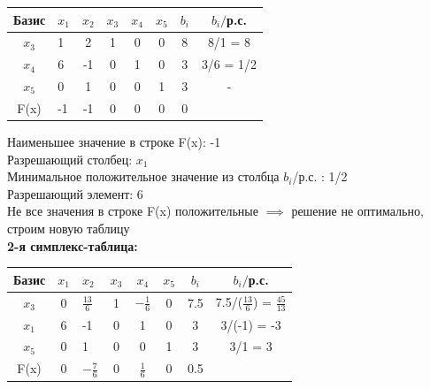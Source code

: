 \begin{center}
    \begin{tabular}{|c | g c c c c c c|} 
         \hline
            Базис & $x_1$ & $x_2$ & $x_3$ & $x_4$ & $x_5$ & $b_i$ & $b_i/$р.с.\\
         \hline
            $x_3$ & 1 & 2 & 1 & 0 & 0 & 8 & 8/1 = 8\\
         \hline
            $x_4$ & 6 & -1 & 0 & 1 & 0 & 3 & 3/6 = 1/2\\
         \hline
            $x_5$ & 0 & 1 & 0 & 0 & 1 & 3 & - \\
         \hline
            F(x) & -1 & -1 & 0 & 0 & 0 & 0 &\\
         \hline
    \end{tabular}
\end{center}

\begin{flushleft}
    Наименьшее значение в строке F(x): -1\\
    Разрешающий столбец: $x_1$\\
    Минимальное положительное значение из столбца $b_i$/р.с. : 1/2\\
    Разрешающий элемент: 6\\
    Не все значения в строке F(x) положительные $\implies$ решение не оптимально, строим новую таблицу\\
    {\bf2-я симплекс-таблица:}\\
\end{flushleft}

\begin{center}
    \begin{tabular}{|c | c g c c c c c|} 
         \hline
            Базис & $x_1$ & $x_2$ & $x_3$ & $x_4$ & $x_5$ & $b_i$ & $b_i/$р.с.\\
         \hline
            $x_3$ & 0 & $\frac{13}{6}$ & 1 & $-\frac{1}{6}$ & 0 & 7.5 & 7.5/($\frac{13}{6}$) = $\frac{45}{13}$\\
         \hline
            $x_1$ & 6 & -1 & 0 & 1 & 0 & 3 & 3/(-1) = -3\\
         \hline
            $x_5$ & 0 & 1 & 0 & 0 & 1 & 3 & 3/1 = 3 \\
         \hline
            F(x) & 0 & $-\frac{7}{6}$ & 0 & $\frac{1}{6}$ & 0 & 0.5 &\\
         \hline
    \end{tabular}
\end{center}

